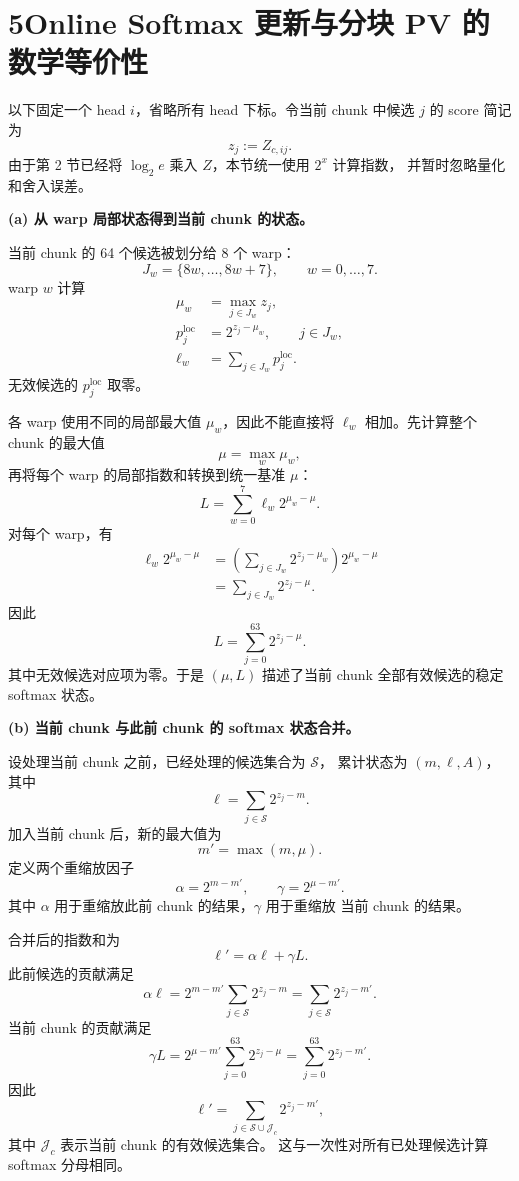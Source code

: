 \documentclass[UTF8,fontset=fandol,a4paper,10pt]{ctexart}
\begin{document}
\section*{5\quad Online Softmax 更新与分块 PV 的数学等价性}

以下固定一个 head $i$，省略所有 head 下标。令当前 chunk 中候选 $j$ 的
score 简记为
\[
  z_j:=Z_{c,ij}.
\]
由于第 2 节已经将 $\log_2e$ 乘入 $Z$，本节统一使用 $2^x$ 计算指数，
并暂时忽略量化和舍入误差。

\textbf{(a) 从 warp 局部状态得到当前 chunk 的状态。}

当前 chunk 的 64 个候选被划分给 8 个 warp：
\[
  J_w=\{8w,\ldots,8w+7\},\qquad w=0,\ldots,7.
\]
warp $w$ 计算
\begin{align*}
  \mu_w
    &=\max_{j\in J_w}z_j,\\
  p^{\mathrm{loc}}_j
    &=2^{z_j-\mu_w},\qquad j\in J_w,\\
  \ell_w
    &=\sum_{j\in J_w}p^{\mathrm{loc}}_j.
\end{align*}
无效候选的 $p^{\mathrm{loc}}_j$ 取零。

各 warp 使用不同的局部最大值 $\mu_w$，因此不能直接将
$\ell_w$ 相加。先计算整个 chunk 的最大值
\[
  \mu=\max_w\mu_w,
\]
再将每个 warp 的局部指数和转换到统一基准 $\mu$：
\[
  L
  =
  \sum_{w=0}^{7}\ell_w2^{\mu_w-\mu}.
\]
对每个 warp，有
\begin{align*}
  \ell_w2^{\mu_w-\mu}
  &=
  \left(
    \sum_{j\in J_w}2^{z_j-\mu_w}
  \right)
  2^{\mu_w-\mu}\\
  &=
  \sum_{j\in J_w}2^{z_j-\mu}.
\end{align*}
因此
\[
  \boxed{
    L=\sum_{j=0}^{63}2^{z_j-\mu}
  }.
\]
其中无效候选对应项为零。于是 $(\mu,L)$ 描述了当前 chunk
全部有效候选的稳定 softmax 状态。

\textbf{(b) 当前 chunk 与此前 chunk 的 softmax 状态合并。}

设处理当前 chunk 之前，已经处理的候选集合为 $\mathcal S$，
累计状态为 $(m,\ell,A)$，其中
\[
  \ell
  =
  \sum_{j\in\mathcal S}2^{z_j-m}.
\]
加入当前 chunk 后，新的最大值为
\[
  m'=\max(m,\mu).
\]
定义两个重缩放因子
\[
  \alpha=2^{m-m'},\qquad
  \gamma=2^{\mu-m'}.
\]
其中 $\alpha$ 用于重缩放此前 chunk 的结果，$\gamma$ 用于重缩放
当前 chunk 的结果。

合并后的指数和为
\[
  \boxed{
    \ell'=\alpha\ell+\gamma L
  }.
\]
此前候选的贡献满足
\[
  \alpha\ell
  =
  2^{m-m'}
  \sum_{j\in\mathcal S}2^{z_j-m}
  =
  \sum_{j\in\mathcal S}2^{z_j-m'}.
\]
当前 chunk 的贡献满足
\[
  \gamma L
  =
  2^{\mu-m'}
  \sum_{j=0}^{63}2^{z_j-\mu}
  =
  \sum_{j=0}^{63}2^{z_j-m'}.
\]
因此
\[
  \ell'
  =
  \sum_{j\in\mathcal S\cup\mathcal J_c}
  2^{z_j-m'},
\]
其中 $\mathcal J_c$ 表示当前 chunk 的有效候选集合。
这与一次性对所有已处理候选计算 softmax 分母相同。
\end{document}
